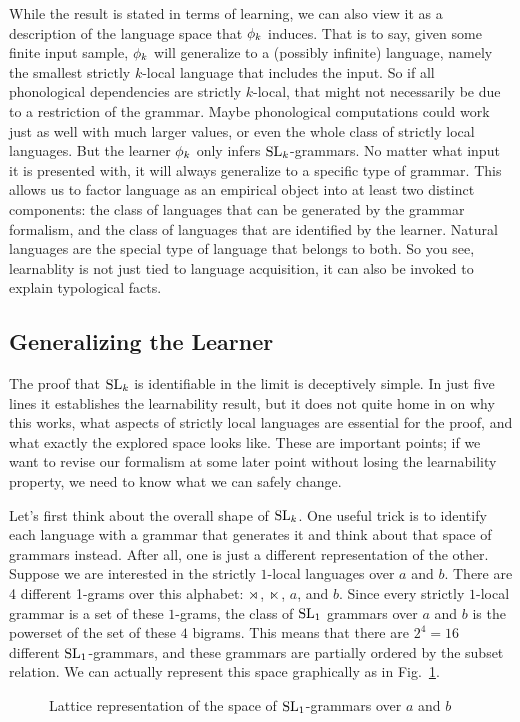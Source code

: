 While the result is stated in terms of learning, we can also view it as a description of the language space that $\phi_k$ induces.
That is to say, given some finite input sample, $\phi_k$ will generalize to a (possibly infinite) language, namely the smallest strictly $k$-local language that includes the input.
So if all phonological dependencies are strictly $k$-local, that might not necessarily be due to a restriction of the grammar.
Maybe phonological computations could work just as well with much larger values, or even the whole class of strictly local languages.
But the learner $\phi_k$ only infers $\mathrm{SL}_k$-grammars.
No matter what input it is presented with, it will always generalize to a specific type of grammar.
This allows us to factor language as an empirical object into at least two distinct components: the class of languages that can be generated by the grammar formalism, and the class of languages that are identified by the learner.
Natural languages are the special type of language that belongs to both.
So you see, learnablity is not just tied to language acquisition, it can also be invoked to explain typological facts.


\subsection{Generalizing the Learner}
The proof that $\mathrm{SL}_k$ is identifiable in the limit is deceptively simple.
In just five lines it establishes the learnability result, but it does not quite home in on why this works, what aspects of strictly local languages are essential for the proof, and what exactly the explored space looks like.
These are important points; if we want to revise our formalism at some later point without losing the learnability property, we need to know what we can safely change.

Let's first think about the overall shape of $\mathrm{SL}_k$.
One useful trick is to identify each language with a grammar that generates it and think about that space of grammars instead.
After all, one is just a different representation of the other.
Suppose we are interested in the strictly $1$-local languages over $a$ and $b$.
There are 4 different 1-grams over this alphabet: $\rtimes$, $\ltimes$, $a$, and $b$. 
Since every strictly $1$-local grammar is a set of these $1$-grams, the class of $\mathrm{SL}_1$ grammars over $a$ and $b$ is the powerset of the set of these $4$ bigrams.
This means that there are $2^4 = 16$ different $\mathrm{SL}_1$-grammars, and these grammars are partially ordered by the subset relation.
We can actually represent this space graphically as in Fig.~\ref{fig:LearnSL_SL1-Lattice}.
%
\begin{figure}[htpb]
    \centering
    
    \caption{Lattice representation of the space of $\mathrm{SL}_1$-grammars over $a$ and $b$}
    \label{fig:LearnSL_SL1-Lattice}
\end{figure}

